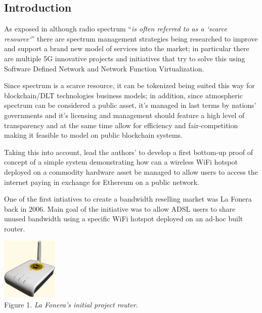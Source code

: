 \documentclass[12pt]{amsart}
\begin{document}
\setlength{\columnsep}{20pt}
\begin{multicols}{2}
\section{Introduction}\label{sec:introduction}

\vspace{0.35cm}
As exposed in \cite{spectrumnh} although radio spectrum
``\textit{is often
  referred to as a `scarce resource`}'' there are
spectrum management strategies
being researched to improve and
support a brand new model of services
into the market; in particular there are
multiple 5G\cite{5g} innovative projects and initiatives
that try to solve this using Software
Defined Network\cite{sdns}
and Network Function Virtualization\cite{nfv}.

\vspace{0.35cm}

Since spectrum is a scarce resource, it can
be tokenized being suited this
way for blockchain/DLT technologies business models;
in addition, since
atmospheric spectrum can be considered a public
asset, it's managed in last terms by nations' governments
and it's licensing and management should feature
a high level of transparency and at the same time
allow for efficiency and fair-competition making it
feasible to model on public blockchain systems.

\vspace{0.35cm}

Taking this into account, lead the authors' to develop
a first bottom-up proof of concept of a simple system
demonstrating how can a wireless WiFi hotspot
deployed on a commodity hardware asset\cite{RaspberryPi19}
be managed to allow users to access the internet
paying in exchange for Ethereum on a public network.

\vspace{0.35cm}

One of the first intiatives to create
a bandwidth reselling market was La Fonera\cite{fon}
back in 2006. Main goal of the initiative was
to allow ADSL users to share unused bandwidth using
a specific WiFi hotspot deployed on an ad-hoc
built router.

\begin{center}
  \includegraphics[keepaspectratio, width=0.2\textwidth]{images/lafonera-sourcewikipedia.eps}
  \\
  Figure 1. \textit{La Fonera's initial project router.}
\end{center}


\end{multicols}
\end{document}

